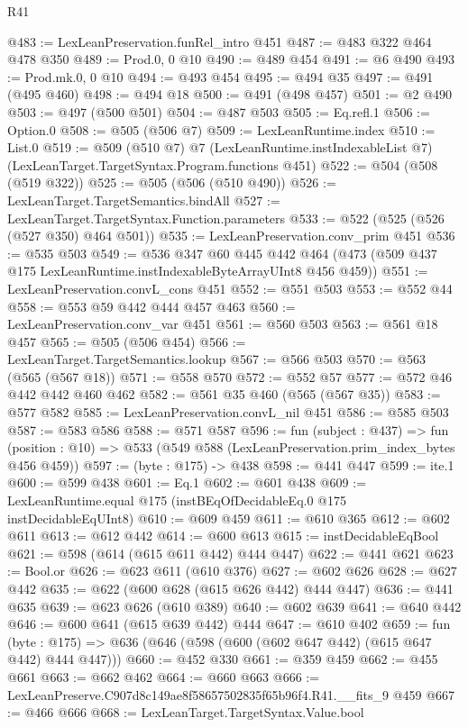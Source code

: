 \begin{lexlean}{R41}
\begin{coremodule}
@483 := LexLeanPreservation.funRel_intro @451
@487 := @483 @322 @464 @478 @350
@489 := Prod.{0, 0} @10
@490 := @489 @454
@491 := @6 @490
@493 := Prod.mk.{0, 0} @10
@494 := @493 @454
@495 := @494 @35
@497 := @491 (@495 @460)
@498 := @494 @18
@500 := @491 (@498 @457)
@501 := @2 @490
@503 := @497 (@500 @501)
@504 := @487 @503
@505 := Eq.refl.{1}
@506 := Option.{0}
@508 := @505 (@506 @7)
@509 := LexLeanRuntime.index
@510 := List.{0}
@519 := @509
    (@510 @7)
    @7
    (LexLeanRuntime.instIndexableList @7)
    (LexLeanTarget.TargetSyntax.Program.functions @451)
@522 := @504 (@508 (@519 @322))
@525 := @505 (@506 (@510 @490))
@526 := LexLeanTarget.TargetSemantics.bindAll
@527 := LexLeanTarget.TargetSyntax.Function.parameters
@533 := @522 (@525 (@526 (@527 @350) @464 @501))
@535 := LexLeanPreservation.conv_prim @451
@536 := @535 @503
@549 := @536
    @347
    @60
    @445
    @442
    @464
    (@473 (@509 @437 @175 LexLeanRuntime.instIndexableByteArrayUInt8 @456 @459))
@551 := LexLeanPreservation.convL_cons @451
@552 := @551 @503
@553 := @552 @44
@558 := @553 @59 @442 @444 @457 @463
@560 := LexLeanPreservation.conv_var @451
@561 := @560 @503
@563 := @561 @18 @457
@565 := @505 (@506 @454)
@566 := LexLeanTarget.TargetSemantics.lookup
@567 := @566 @503
@570 := @563 (@565 (@567 @18))
@571 := @558 @570
@572 := @552 @57
@577 := @572 @46 @442 @442 @460 @462
@582 := @561 @35 @460 (@565 (@567 @35))
@583 := @577 @582
@585 := LexLeanPreservation.convL_nil @451
@586 := @585 @503
@587 := @583 @586
@588 := @571 @587
@596 := fun (subject : @437) =>
  fun (position : @10) => @533 (@549 @588 (LexLeanPreservation.prim_index_bytes @456 @459))
@597 := (byte : @175) -> @438
@598 := @441 @447
@599 := ite.{1}
@600 := @599 @438
@601 := Eq.{1}
@602 := @601 @438
@609 := LexLeanRuntime.equal @175 (instBEqOfDecidableEq.{0} @175 instDecidableEqUInt8)
@610 := @609 @459
@611 := @610 @365
@612 := @602 @611
@613 := @612 @442
@614 := @600 @613
@615 := instDecidableEqBool
@621 := @598 (@614 (@615 @611 @442) @444 @447)
@622 := @441 @621
@623 := Bool.or
@626 := @623 @611 (@610 @376)
@627 := @602 @626
@628 := @627 @442
@635 := @622 (@600 @628 (@615 @626 @442) @444 @447)
@636 := @441 @635
@639 := @623 @626 (@610 @389)
@640 := @602 @639
@641 := @640 @442
@646 := @600 @641 (@615 @639 @442) @444
@647 := @610 @402
@659 := fun (byte : @175) => @636 (@646 (@598 (@600 (@602 @647 @442) (@615 @647 @442) @444 @447)))
@660 := @452 @330
@661 := @359 @459
@662 := @455 @661
@663 := @662 @462
@664 := @660 @663
@666 := LexLeanPreserve.C907d8c149ae8f58657502835f65b96f4.R41.__fits_9 @459
@667 := @466 @666
@668 := LexLeanTarget.TargetSyntax.Value.bool

\end{coremodule}
\end{lexlean}

